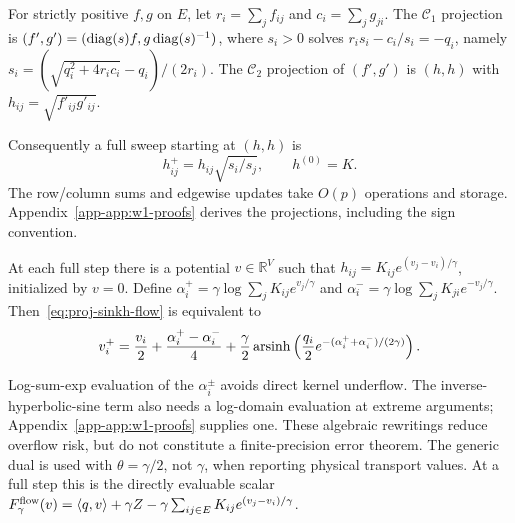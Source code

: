 \begin{proposition}\label{prop:graphw1-projection-closed-form}
For strictly positive $f,g$ on $E$, let $r_i=\sum_j f_{ij}$ and $c_i=\sum_j g_{ji}$. The $\mathcal C_1$ projection is $(f',g')=(\operatorname{diag}(s)f,g\operatorname{diag}(s)^{-1})$, where $s_i>0$ solves $r_is_i-c_i/s_i=-q_i$, namely $s_i=(\sqrt{q_i^2+4r_ic_i}-q_i)/(2r_i)$. The $\mathcal C_2$ projection of $(f',g')$ is $(h,h)$ with $h_{ij}=\sqrt{f'_{ij}g'_{ij}}$.
\end{proposition}
Consequently a full sweep starting at $(h,h)$ is
\begin{equation}\label{eq:proj-sinkh-flow}
 h^{+}_{ij}=h_{ij}\sqrt{s_i/s_j},\qquad h^{(0)}=K.
\end{equation}
The row/column sums and edgewise updates take $O(p)$ operations and storage. Appendix~\ref{app-app:w1-proofs} derives the projections, including the sign convention.

\begin{proposition}\label{prop:graphw1-flow-sinkhorn-update}
At each full step there is a potential $v\in\mathbb R^V$ such that $h_{ij}=K_{ij}e^{(v_j-v_i)/\gamma}$, initialized by $v=0$. Define $\alpha_i^+=\gamma\log\sum_jK_{ij}e^{v_j/\gamma}$ and $\alpha_i^-=\gamma\log\sum_jK_{ji}e^{-v_j/\gamma}$. Then~\eqref{eq:proj-sinkh-flow} is equivalent to
\begin{equation}\label{eq:v-update-stable}
 v_i^+=\frac{v_i}{2}+\frac{\alpha_i^+-\alpha_i^-}{4}
 +\frac\gamma2\operatorname{arsinh}\left(\frac{q_i}{2}
 e^{-(\alpha_i^++\alpha_i^-)/(2\gamma)}\right).
\end{equation}
\end{proposition}
Log-sum-exp evaluation of the $\alpha_i^\pm$ avoids direct kernel underflow. The inverse-hyperbolic-sine term also needs a log-domain evaluation at extreme arguments; Appendix~\ref{app-app:w1-proofs} supplies one. These algebraic rewritings reduce overflow risk, but do not constitute a finite-precision error theorem. The generic dual is used with $\theta=\gamma/2$, not $\gamma$, when reporting physical transport values. At a full step this is the directly evaluable scalar $F_\gamma^{\rm flow}(v)=\langle q,v\rangle+\gamma Z-\gamma\sum_{ij\in E}K_{ij}e^{(v_j-v_i)/\gamma}$.


